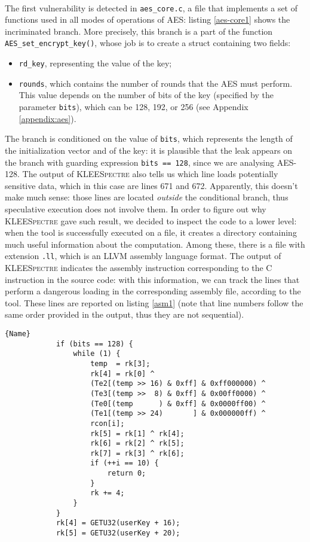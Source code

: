 \documentclass[target=mst,aauheader=aics]{thud}
\theoremstyle{definition}
\begin{document}
	\paragraph{} The first vulnerability is detected in \texttt{aes\_core.c}, a file that implements a set of functions used in all modes of operations of AES: listing \ref{aes-core1} shows the incriminated branch. More precisely, this branch is a part of the function \texttt{AES\_set\_encrypt\_key()}, whose job is to create a struct containing two fields:
	\begin{itemize}
		\item \texttt{rd\_key}, representing the value of the key;
		\item \texttt{rounds}, which contains the number of rounds that the AES must perform. This value depends on the number of bits of the key (specified by the parameter \texttt{bits}), which can be 128, 192, or 256 (see Appendix \ref{appendix:aes}). 
	\end{itemize}
	The branch is conditioned on the value of \texttt{bits}, which represents the length of the initialization vector and of the key: it is plausible that the leak appears on the branch with guarding expression \texttt{bits == 128}, since we are analysing AES-128. The output of \textsc{KLEESpectre} also tells us which line loads potentially sensitive data, which in this case are lines 671 and 672. Apparently, this doesn't make much sense: those lines are located \textit{outside} the conditional branch, thus speculative execution does not involve them. In order to figure out why \textsc{KLEESpectre} gave such result, we decided to inspect the code to a lower level: when the tool is successfully executed on a file, it creates a directory containing much useful information about the computation. Among these, there is a file with extension \texttt{.ll}, which is an LLVM assembly language format. The output of \textsc{KLEESpectre} indicates the assembly instruction corresponding to the C instruction in the source code: with this information, we can track the lines that perform a dangerous loading in the corresponding assembly file, according to the tool. These lines are reported on listing \ref{asm1} (note that line numbers follow the same order provided in the output, thus they are not sequential).
	
	\begin{minipage}{.75\textwidth}
		\begin{lstlisting}[caption=\texttt{aes\_core.c}, firstnumber=653, label=aes-core1]{Name}
			if (bits == 128) {
				while (1) {
					temp  = rk[3];
					rk[4] = rk[0] ^
					(Te2[(temp >> 16) & 0xff] & 0xff000000) ^
					(Te3[(temp >>  8) & 0xff] & 0x00ff0000) ^
					(Te0[(temp      ) & 0xff] & 0x0000ff00) ^
					(Te1[(temp >> 24)       ] & 0x000000ff) ^
					rcon[i];
					rk[5] = rk[1] ^ rk[4];
					rk[6] = rk[2] ^ rk[5];
					rk[7] = rk[3] ^ rk[6];
					if (++i == 10) {
						return 0;
					}
					rk += 4;
				}
			}
			rk[4] = GETU32(userKey + 16);
			rk[5] = GETU32(userKey + 20);
		\end{lstlisting}
	\end{minipage}
	\vspace{3mm}
	
\end{document}
